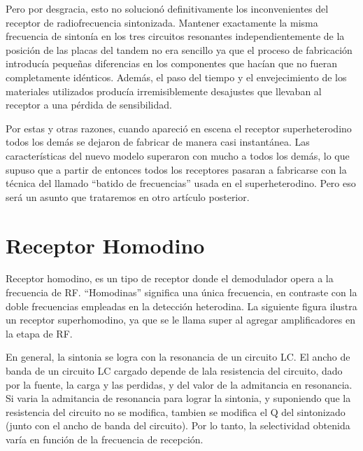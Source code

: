 \documentclass[letterpaper,11pt,spanish]{sphinxmanual}
\let\sphinxpxdimen\pdfpxdimen\else\newdimen\sphinxpxdimen
\begin{document}
Pero por desgracia, esto no solucionó definitivamente los inconvenientes del receptor de radiofrecuencia sintonizada. Mantener exactamente la misma frecuencia de sintonía en los tres circuitos resonantes independientemente de la posición de las placas del tandem no era sencillo ya que el proceso de fabricación introducía pequeñas diferencias en los componentes que hacían que no fueran completamente idénticos. Además, el paso del tiempo y el envejecimiento de los materiales utilizados producía
irremisiblemente desajustes que llevaban al receptor a una pérdida de sensibilidad.

Por estas y otras razones, cuando apareció en escena el receptor superheterodino todos los demás se dejaron de fabricar de manera casi instantánea. Las características del nuevo modelo superaron con mucho a todos los demás, lo que supuso que a partir de entonces todos los receptores pasaran a fabricarse con la técnica del llamado “batido de frecuencias” usada en el superheterodino. Pero eso será un asunto que trataremos en otro artículo posterior.


\chapter{Receptor Homodino}
\label{\detokenize{introduccion/sistemas:Receptor-Homodino}}
Receptor homodino, es un tipo de receptor donde el demodulador opera a la frecuencia de RF. “Homodinas” significa una única frecuencia, en contraste con la doble frecuencias empleadas en la detección heterodina. La siguiente figura ilustra un receptor super\sphinxhyphen{}homodino, ya que se le llama super al agregar amplificadores en la etapa de RF.

\sphinxincludegraphics[width=919\sphinxpxdimen,height=270\sphinxpxdimen]{{homodino}.png}

En general, la sintonia se logra con la resonancia de un circuito LC. El ancho de banda de un circuito LC cargado depende de lala resistencia del circuito, dado por la fuente, la carga y las perdidas, y del valor de la admitancia en resonancia. Si varia la admitancia de resonancia para lograr la sintonia, y suponiendo que la resistencia del circuito no se modifica, tambien se modifica el Q del sintonizado (junto con el ancho de banda del circuito). Por lo tanto, la selectividad obtenida varía en
función de la frecuencia de recepción.

\sphinxincludegraphics[width=919\sphinxpxdimen,height=270\sphinxpxdimen]{{homodino2}.png}
\end{document}
